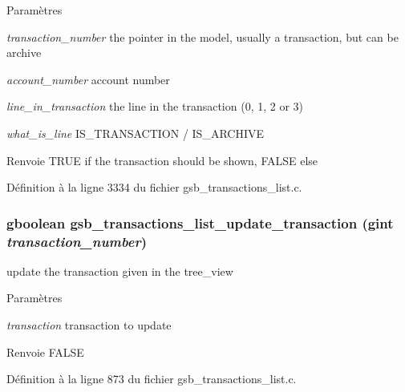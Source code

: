 \begin{DoxyParams}{Paramètres}
\item[{\em transaction\_\-number}]the pointer in the model, usually a transaction, but can be archive \item[{\em account\_\-number}]account number \item[{\em line\_\-in\_\-transaction}]the line in the transaction (0, 1, 2 or 3) \item[{\em what\_\-is\_\-line}]IS\_\-TRANSACTION / IS\_\-ARCHIVE\end{DoxyParams}
\begin{DoxyReturn}{Renvoie}
TRUE if the transaction should be shown, FALSE else 
\end{DoxyReturn}


Définition à la ligne 3334 du fichier gsb\_\-transactions\_\-list.c.

\subsubsection[{gsb\_\-transactions\_\-list\_\-update\_\-transaction}]{\setlength{\rightskip}{0pt plus 5cm}gboolean gsb\_\-transactions\_\-list\_\-update\_\-transaction (gint {\em transaction\_\-number})}\label{gsb__transactions__list_8c_a83f53b0c0b9da33efa7f7691ea939f9e}
update the transaction given in the tree\_\-view


\begin{DoxyParams}{Paramètres}
\item[{\em transaction}]transaction to update\end{DoxyParams}
\begin{DoxyReturn}{Renvoie}
FALSE 
\end{DoxyReturn}


Définition à la ligne 873 du fichier gsb\_\-transactions\_\-list.c.


